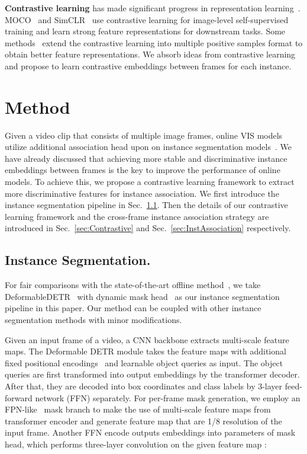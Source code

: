 \documentclass[runningheads]{llncs}
\begin{document}
\noindent\textbf{Contrastive learning} has made significant progress in representation learning~\cite{simclr,MOCO,QDTrack,coclr,predictivecoding,representation,non-parametric,Circleloss}. MOCO~\cite{MOCO} and SimCLR~\cite{simclr} use contrastive learning for image-level self-supervised training and learn strong feature representations for downstream tasks.
Some methods~\cite{coclr,supervised,videorep} extend the contrastive learning into multiple positive samples format to obtain better feature representations.
We absorb ideas from contrastive learning and propose to learn contrastive embeddings between frames for each instance.

\section{Method}


Given a video clip that consists of multiple image frames, online VIS models~\cite{MaskTrackRCNN,CrossVIS} utilize additional association head upon on instance segmentation models~\cite{MaskRCNN,CondInst}. 
We have already discussed that achieving more stable and discriminative instance embeddings between frames is the key to improve the performance of online models. To achieve this, we propose a contrastive learning framework to extract more discriminative features for instance association. 
We first introduce the instance segmentation pipeline in Sec.~\ref{sec:InstSeg}. Then the details of our contrastive learning framework and the cross-frame instance association strategy are introduced in Sec.~\ref{sec:Contrastive} and Sec.~\ref{sec:InstAssociation} respectively.

\subsection{Instance Segmentation.}
\label{sec:InstSeg}
For fair comparisons with the state-of-the-art offline method~\cite{seqformer}, we take DeformableDETR~\cite{deformableDETR} with dynamic mask head~\cite{CondInst} as our instance segmentation pipeline in this paper.
Our method can be coupled with other instance segmentation methods with minor modifications.

Given an input frame  of a video, a CNN backbone extracts multi-scale feature maps. The Deformable DETR module takes the feature maps with additional fixed positional encodings~\cite{detr} and  learnable object queries as input. The object queries are first transformed into output embeddings  by the transformer decoder. After that, they are decoded into box coordinates and class labels by 3-layer feed-forward network (FFN) separately. 
For per-frame mask generation, we employ an FPN-like~\cite{FPN} mask branch to make the use of multi-scale feature maps from transformer encoder and generate feature map  that
are 1/8 resolution of the input frame.  
Another FFN encode outputs embeddings into parameters  of mask head, which performs three-layer  convolution on the given feature map :
\end{document}
